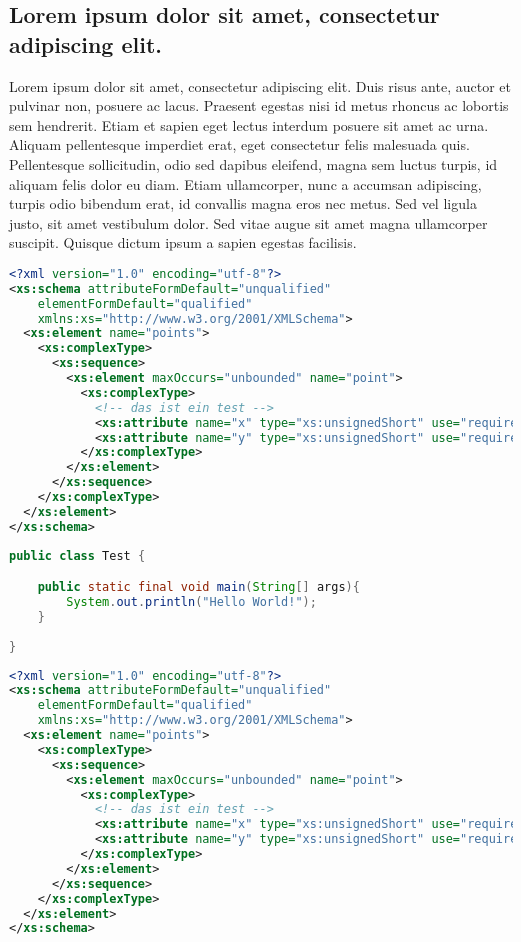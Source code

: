 \subsection{Lorem ipsum dolor sit amet, consectetur adipiscing elit.}
Lorem ipsum dolor sit amet, consectetur adipiscing elit. Duis risus ante, auctor et pulvinar non, posuere ac lacus. Praesent egestas nisi id metus rhoncus ac lobortis sem hendrerit. Etiam et sapien eget lectus interdum posuere sit amet ac urna. Aliquam pellentesque imperdiet erat, eget consectetur felis malesuada quis. Pellentesque sollicitudin, odio sed dapibus eleifend, magna sem luctus turpis, id aliquam felis dolor eu diam. Etiam ullamcorper, nunc a accumsan adipiscing, turpis odio bibendum erat, id convallis magna eros nec metus. Sed vel ligula justo, sit amet vestibulum dolor. Sed vitae augue sit amet magna ullamcorper suscipit. Quisque dictum ipsum a sapien egestas facilisis.


\begin{lstlisting}[language=XML]
<?xml version="1.0" encoding="utf-8"?>
<xs:schema attributeFormDefault="unqualified" 
    elementFormDefault="qualified" 
    xmlns:xs="http://www.w3.org/2001/XMLSchema">
  <xs:element name="points">
    <xs:complexType>
      <xs:sequence>
        <xs:element maxOccurs="unbounded" name="point">
          <xs:complexType>
            <!-- das ist ein test -->  
            <xs:attribute name="x" type="xs:unsignedShort" use="required" />
            <xs:attribute name="y" type="xs:unsignedShort" use="required" />
          </xs:complexType>
        </xs:element>
      </xs:sequence>
    </xs:complexType>
  </xs:element>
</xs:schema>
\end{lstlisting}

 
\begin{lstlisting}[language=Java, caption=Java Code example]
public class Test {

    public static final void main(String[] args){
        System.out.println("Hello World!");
    }
    
}
\end{lstlisting}



\begin{lstlisting}[language=XML, caption=XML Snippet example]
<?xml version="1.0" encoding="utf-8"?>
<xs:schema attributeFormDefault="unqualified" 
    elementFormDefault="qualified" 
    xmlns:xs="http://www.w3.org/2001/XMLSchema">
  <xs:element name="points">
    <xs:complexType>
      <xs:sequence>
        <xs:element maxOccurs="unbounded" name="point">
          <xs:complexType>
            <!-- das ist ein test -->  
            <xs:attribute name="x" type="xs:unsignedShort" use="required" />
            <xs:attribute name="y" type="xs:unsignedShort" use="required" />
          </xs:complexType>
        </xs:element>
      </xs:sequence>
    </xs:complexType>
  </xs:element>
</xs:schema>
\end{lstlisting}

